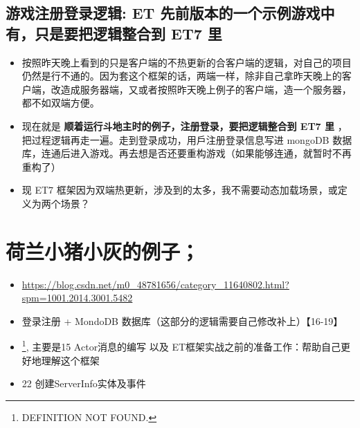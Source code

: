 \documentclass[9pt, b5paper]{article}
\begin{document}
\subsection{游戏注册登录逻辑: ET 先前版本的一个示例游戏中有，只是要把逻辑整合到 ET7 里}
\label{sec-8-1}
\begin{itemize}
\item 按照昨天晚上看到的只是客户端的不热更新的合客户端的逻辑，对自己的项目仍然是行不通的。因为套这个框架的话，两端一样，除非自己拿昨天晚上的客户端，改造成服务器端，又或者按照昨天晚上例子的客户端，造一个服务器，都不如双端方便。
\item 现在就是 \textbf{顺着运行斗地主时的例子，注册登录，要把逻辑整合到 ET7 里} ，把过程逻辑再走一遍。走到登录成功，用戶注册登录信息写进 mongoDB 数据库，连通后进入游戏。再去想是否还要重构游戏（如果能够连通，就暂时不再重构了）
\item 现 ET7 框架因为双端热更新，涉及到的太多，我不需要动态加载场景，或定义为两个场景？
\end{itemize}
\section{荷兰小猪小灰的例子；}
\label{sec-9}
\begin{itemize}
\item \url{https://blog.csdn.net/m0_48781656/category_11640802.html?spm=1001.2014.3001.5482}
\item 登录注册 + MondoDB 数据库（这部分的逻辑需要自己修改补上）【16-19】
\item \footnote{DEFINITION NOT FOUND.}, 主要是15 Actor消息的编写 以及 ET框架实战之前的准备工作：帮助自己更好地理解这个框架
\item 22 创建ServerInfo实体及事件
\end{itemize}
\end{document}
